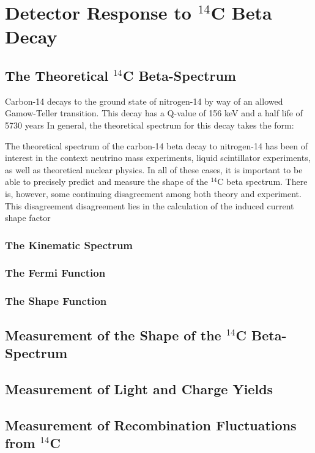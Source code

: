 \chapter{Detector Response to $^{14}$C Beta Decay}

\section{The Theoretical $^{14}$C Beta-Spectrum}
Carbon-14 decays to the ground state of nitrogen-14 by way of an allowed Gamow-Teller transition. This decay has a Q-value of 156 keV and a half life of 5730 years In general, the theoretical spectrum for this decay takes the form:

The theoretical spectrum of the carbon-14 beta decay to nitrogen-14 has been of interest in the context neutrino mass experiments\cite{C14_Wietfeldt}, liquid scintillator experiments\cite{C14_Borexino, C14_Bergeron}, as well as theoretical nuclear physics\cite{C14_Kuzminov,C14_Genz,C14_Garcia}. In all of these cases, it is important to be able to precisely predict and measure the shape of the $^{14}$C beta spectrum. There is, however, some continuing disagreement among both theory and experiment. This disagreement disagreement lies in the calculation of the induced current shape factor


\subsection{The Kinematic Spectrum}
\subsection{The Fermi Function}
\subsection{The Shape Function}



\section{Measurement of the Shape of the $^{14}$C Beta-Spectrum}


\section{Measurement of Light and Charge Yields}


\section{Measurement of Recombination Fluctuations from $^{14}$C}